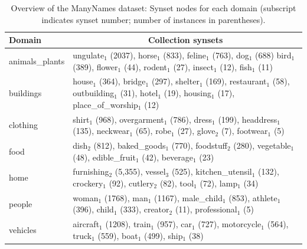 
\begin{table}[htp]
	\small
	\centering
	\begin{tabular}{lp{14cm}}
			\toprule
			Domain & \multicolumn{1}{c}{Collection synsets}\\
			\midrule			
			animals\_plants & ungulate$_1$ (2037), horse$_1$ (833), feline$_1$ (763), dog$_1$ (688)
			bird$_1$ (389), flower$_1$ (44), rodent$_1$ (27), insect$_1$ (12), fish$_1$ (11)\\
			buildings      &  house$_1$ (364), bridge$_1$ (297), shelter$_1$ (169), restaurant$_1$ (58),
                                         outbuilding$_1$ (31), hotel$_1$ (19), housing$_1$ (17), place\_of\_worship$_1$ (12)     \\
			clothing       &  shirt$_1$ (968), overgarment$_1$ (786), dress$_1$ (199), headdress$_1$ (135),
                                         neckwear$_1$ (65), robe$_1$ (27), glove$_2$ (7), footwear$_1$ (5)    \\
			food           &  dish$_2$ (812), baked\_goods$_1$ (770), foodstuff$_2$ (280), vegetable$_1$ (48),
                                         edible\_fruit$_1$ (42), beverage$_1$ (23)   \\
			home           &  furnishing$_2$ (5,355), vessel$_3$ (525), kitchen\_utensil$_1$ (132), crockery$_1$ (92),
			cutlery$_2$ (82), tool$_1$ (72), lamp$_1$ (34)    \\
			people         & woman$_1$ (1768), man$_1$ (1167), male\_child$_1$ (853), athlete$_1$ (396),
			 child$_1$ (333), creator$_2$ (11), professional$_1$ (5)    \\
			vehicles       &  aircraft$_1$ (1208), train$_1$ (957), car$_1$ (727), motorcycle$_1$ (564),
                                         truck$_1$ (559), boat$_1$ (499), ship$_1$ (38)    \\
			\bottomrule
		\end{tabular}
		\caption{Overview of the ManyNames dataset: Synset nodes for each domain (subscript indicates synset number; number of instances in parentheses).
                  \label{tab:overview_dataset2}}
	\end{table}

